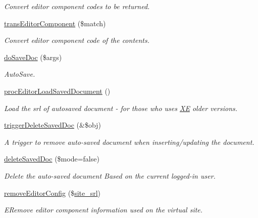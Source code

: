 \begin{DoxyCompactItemize}
\begin{DoxyCompactList}\small\item\em Convert editor component codes to be returned. \end{DoxyCompactList}\item 
\hyperlink{classeditorController_a278ef1204d8129636bb8d30a0c91c5bb}{trans\+Editor\+Component} (\$match)
\begin{DoxyCompactList}\small\item\em Convert editor component code of the contents. \end{DoxyCompactList}\item 
\hyperlink{classeditorController_a9e5a3fdca13b5ac5c507964fbcd74d35}{do\+Save\+Doc} (\$args)
\begin{DoxyCompactList}\small\item\em Auto\+Save. \end{DoxyCompactList}\item 
\hyperlink{classeditorController_a00edb6a2633a7578c40bda1cba61f041}{proc\+Editor\+Load\+Saved\+Document} ()
\begin{DoxyCompactList}\small\item\em Load the srl of autosaved document -\/ for those who uses \hyperlink{namespaceXE}{XE} older versions. \end{DoxyCompactList}\item 
\hyperlink{classeditorController_a9a141433e80917efe9280dc8eb4fe5c2}{trigger\+Delete\+Saved\+Doc} (\&\$obj)
\begin{DoxyCompactList}\small\item\em A trigger to remove auto-\/saved document when inserting/updating the document. \end{DoxyCompactList}\item 
\hyperlink{classeditorController_abfe95017a9b2baa548dde4a339af5df4}{delete\+Saved\+Doc} (\$mode=false)
\begin{DoxyCompactList}\small\item\em Delete the auto-\/saved document Based on the current logged-\/in user. \end{DoxyCompactList}\item 
\hyperlink{classeditorController_a0c27d19482d9ad6c9de0e42ad7ad6465}{remove\+Editor\+Config} (\$\hyperlink{ko_8install_8php_a8b1406b4ad1048041558dce6bfe89004}{site\+\_\+srl})
\begin{DoxyCompactList}\small\item\em E\+Remove editor component information used on the virtual site. \end{DoxyCompactList}\item 

\end{DoxyCompactItemize}
